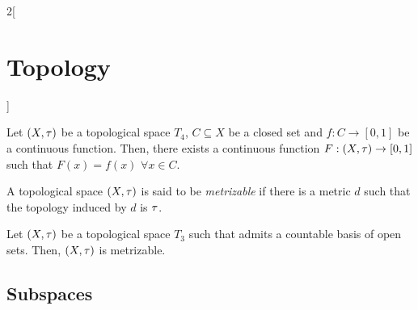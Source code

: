 \documentclass[../../../main.tex]{subfiles}
\begin{document}
\begin{multicols}{2}[\section{Topology}]
\begin{lemma}
  \end{lemma}
  \begin{theorem}
    Let $(X,\tau)$ be a topological space $T_4$, $C\subseteq X$ be a closed set and $f:C\rightarrow[0,1]$ be a continuous function. Then, there exists a continuous function $F:(X,\tau)\rightarrow[0,1]$ such that $F(x)=f(x)$ $\forall x\in C$.
  \end{theorem}
  \begin{definition}
    A topological space $(X,\tau)$ is said to be \textit{metrizable} if there is a metric $d$ such that the topology induced by $d$ is $\tau$.
  \end{definition}
  \begin{theorem}
    Let $(X,\tau)$ be a topological space $T_3$ such that admits a countable basis of open sets. Then, $(X,\tau)$ is metrizable.
  \end{theorem}
  \subsection{Subspaces}

\end{multicols}
\end{document}
